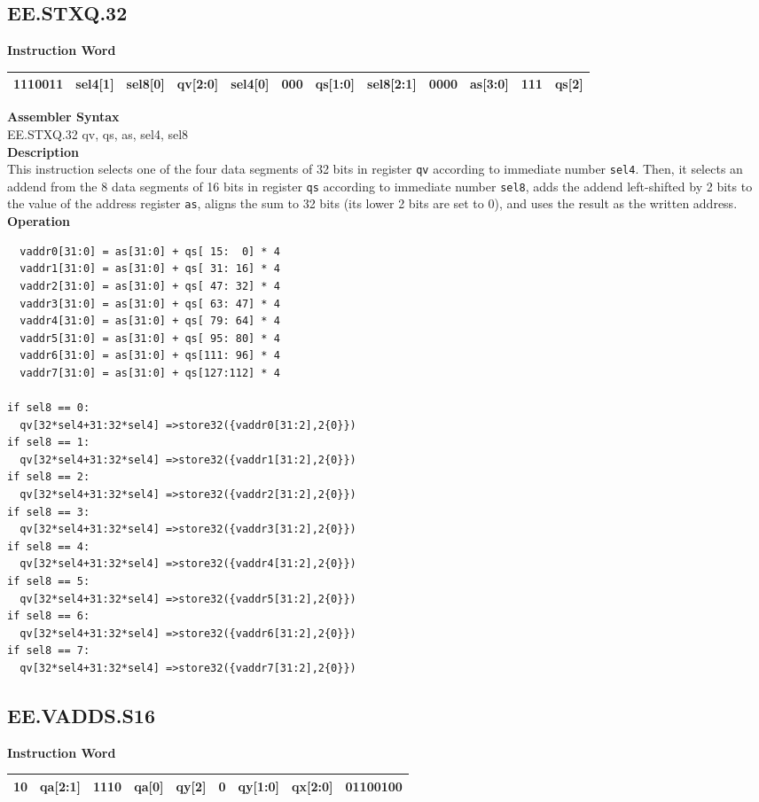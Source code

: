 \clearpage
\subsection{EE.STXQ.32}\label{instruction:EESTXQ32}
\setlength\tabcolsep{6pt}
\textbf{Instruction Word} \\
\begin{tabular}{|c|c|c|c|c|c|c|c|c|c|c|c|}
	\hline
	1110011 & sel4[1] & sel8[0] & qv[2:0] & sel4[0] & 000 & qs[1:0] & sel8[2:1] & 0000 & as[3:0] & 111 & qs[2] \\
	\hline
\end{tabular}

\textbf{Assembler Syntax} \\
EE.STXQ.32 qv, qs, as, sel4, sel8 \\
\textbf{Description} \\
This instruction selects one of the four data segments of 32 bits in register \lstinline{qv} according to immediate number \lstinline{sel4}. Then, it selects an addend from the 8 data segments of 16 bits in register \lstinline{qs} according to immediate number \lstinline{sel8}, adds the addend left-shifted by 2 bits to the value of the address register \lstinline{as}, aligns the sum to 32 bits (its lower 2 bits are set to 0), and uses the result as the written address.\\
\textbf{Operation}
\begin{lstlisting}
  vaddr0[31:0] = as[31:0] + qs[ 15:  0] * 4
  vaddr1[31:0] = as[31:0] + qs[ 31: 16] * 4
  vaddr2[31:0] = as[31:0] + qs[ 47: 32] * 4
  vaddr3[31:0] = as[31:0] + qs[ 63: 47] * 4
  vaddr4[31:0] = as[31:0] + qs[ 79: 64] * 4
  vaddr5[31:0] = as[31:0] + qs[ 95: 80] * 4
  vaddr6[31:0] = as[31:0] + qs[111: 96] * 4
  vaddr7[31:0] = as[31:0] + qs[127:112] * 4

if sel8 == 0:
  qv[32*sel4+31:32*sel4] =>store32({vaddr0[31:2],2{0}})
if sel8 == 1:
  qv[32*sel4+31:32*sel4] =>store32({vaddr1[31:2],2{0}})
if sel8 == 2:
  qv[32*sel4+31:32*sel4] =>store32({vaddr2[31:2],2{0}})
if sel8 == 3:
  qv[32*sel4+31:32*sel4] =>store32({vaddr3[31:2],2{0}})
if sel8 == 4:
  qv[32*sel4+31:32*sel4] =>store32({vaddr4[31:2],2{0}})
if sel8 == 5:
  qv[32*sel4+31:32*sel4] =>store32({vaddr5[31:2],2{0}})
if sel8 == 6:
  qv[32*sel4+31:32*sel4] =>store32({vaddr6[31:2],2{0}})
if sel8 == 7:
  qv[32*sel4+31:32*sel4] =>store32({vaddr7[31:2],2{0}})
\end{lstlisting}

\clearpage
\subsection{EE.VADDS.S16}\label{instruction:EEVADDSS16}
\setlength\tabcolsep{6pt}
\textbf{Instruction Word} \\
\begin{tabular}{|c|c|c|c|c|c|c|c|c|}
	\hline
	10 & qa[2:1] & 1110 & qa[0] & qy[2] & 0 & qy[1:0] & qx[2:0] & 01100100 \\
	\hline
\end{tabular}

